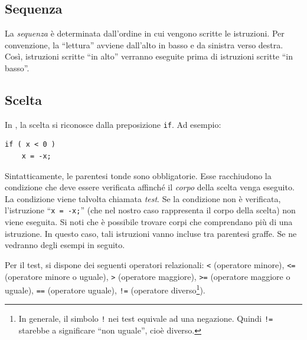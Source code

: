 		\subsection{Sequenza}
La \emph{sequenza} è determinata dall'ordine in cui vengono scritte le istruzioni. Per convenzione, la ``lettura'' avviene dall'alto in basso e da sinistra verso destra. Così, istruzioni scritte ``in alto'' verranno eseguite prima di istruzioni scritte ``in basso''.

		\subsection{Scelta}
In , la scelta si riconosce dalla preposizione \lstinline!if!. Ad esempio:

\begin{lstlisting}
if ( x < 0 )
	x = -x;
\end{lstlisting}
Sintatticamente, le parentesi tonde sono obbligatorie.
Esse racchiudono la condizione che deve essere verificata affinché il \emph{corpo} della scelta venga eseguito.
La condizione viene talvolta chiamata \emph{test}.
Se la condizione non è verificata, l'istruzione ``\lstinline!x = -x;!'' (che nel nostro caso rappresenta il corpo della scelta) non viene eseguita.
Si noti che è possibile trovare corpi che comprendano più di una istruzione.
In questo caso, tali istruzioni vanno incluse tra parentesi graffe.
Se ne vedranno degli esempi in seguito.

Per  il test, si dispone dei seguenti operatori relazionali: \lstinline!<! (operatore minore), \lstinline!<=! (operatore minore o uguale), \lstinline!>! (operatore maggiore), \lstinline!>=! (operatore maggiore o uguale), \lstinline!==! (operatore uguale), \lstinline?!=? (operatore diverso\footnote{In generale, il simbolo \lstinline?!? nei test equivale ad una negazione. Quindi \lstinline?!=? starebbe a significare ``non uguale'', cioè diverso.}).


